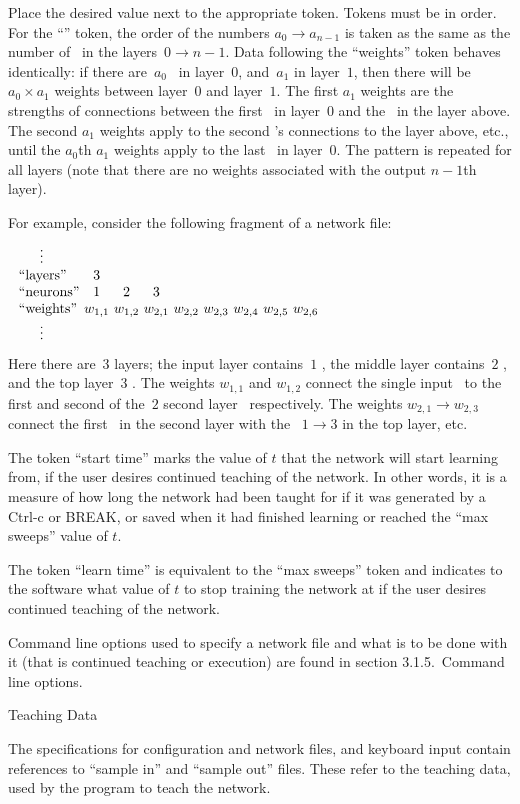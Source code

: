 Place the desired value next to the appropriate token.
Tokens must be in order.
For the ``\neus'' token, the order of the numbers $a_0\to a_{n-1}$ is
taken as the same as the number of \neus\ in the layers~$0\to n-1$.
Data following the ``weights'' token behaves identically: if there
are~$a_0$ \neus\ in layer~$0$, and~$a_1$ in layer~$1$, then there
will be $a_0 \times a_1$ weights between layer~$0$ and layer~$1$.
The first $a_1$ weights are the strengths of connections between
the first \neu\ in layer~$0$ and the \neus\ in the layer above.
The second $a_1$ weights apply to the second \neu's connections to
the layer above, etc., until the $a_0$th $a_1$ weights apply to the
last \neu\ in layer~$0$.
The pattern is repeated for all layers (note that there are no weights
associated with the output $n-1$th layer).

For example, consider the following fragment of a network file:
$$\vbox{
\halign{#\hfil&&\ \hfil#\hfil\cr
	\noalign{$\vdots$}
	``layers''&$3$\cr
	``neurons''&$1$&$2$&$3$\cr
	``weights''&$w_{1,1}$&$w_{1,2}$&$w_{2,1}$&$w_{2,2}$&
		$w_{2,3}$&$w_{2,4}$&$w_{2,5}$&$w_{2,6}$\cr
	\noalign{$\vdots$}
}}
$$
Here there are~$3$ layers; the input layer contains~$1$ \neu, the
middle layer contains~$2$ \neus, and the top layer~$3$ \neus.
The weights $w_{1,1}$ and $w_{1,2}$ connect the single input \neu\ to the
first and second of the~$2$ second layer \neus\ respectively.
The weights $w_{2,1}\to w_{2,3}$ connect the first \neu\ in the
second layer with the \neus~$1\to 3$ in the top layer, etc.

The token ``start time'' marks the value of $t$ that the network
will start learning from, if the user desires continued teaching of
the network.
In other words, it is a measure of how long the network had been
taught for if it was generated by a Ctrl-c or BREAK, or saved when
it had finished learning or reached the ``max sweeps'' value of
$t$.

The token ``learn time'' is equivalent to the ``max sweeps'' token
and indicates to the software what value of $t$ to stop 
training the network at if the user desires continued teaching of
the network.

Command line options used to specify a network file and what is to
be done with it (that is continued teaching or execution) are found
in section 3.1.5.~Command line options.

\ssec Teaching Data

The specifications for configuration and network files, and
keyboard input contain references to ``sample in'' and
``sample out'' files.
These refer to the teaching data, used by the program to teach the
network.

